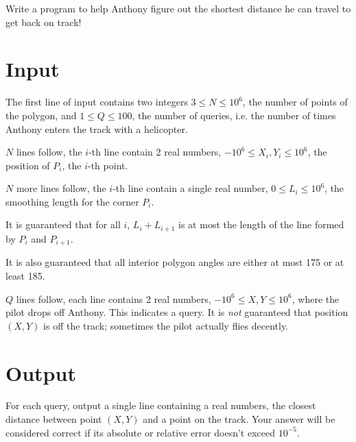 Write a program to help Anthony figure out the shortest distance he can travel to get back on track!

\section*{Input}

The first line of input contains two integers $3 \leq N \leq 10^6$, the number of points of the polygon, and $1\leq Q\leq 100$, the number of queries, i.e. the number of times Anthony enters the track with a helicopter.

$N$ lines follow, the $i$-th line contain 2 real numbers, $-10^6\leq X_i,Y_i\leq 10^6$, the position of $P_i$, the $i$-th point.

$N$ more lines follow, the $i$-th line contain a single real number, $0\leq L_i\leq 10^6$, the smoothing length for the corner $P_{i}$.

It is guaranteed that for all $i$, $L_i+L_{i+1}$ is at most the length of the line formed by $P_i$ and $P_{i+1}$.

It is also guaranteed that all interior polygon angles are either at most 175 or at least 185.

$Q$ lines follow, each line contains 2 real numbers, $-10^6\leq X,Y\leq 10^6$, where the pilot drops off Anthony. This indicates a query. It is \emph{not} guaranteed that position $(X,Y)$ is off the track; sometimes the pilot actually flies decently.

\section*{Output}

For each query, output a single line containing a real numbers, the closest distance between point $(X,Y)$ and a point on the track.
Your answer will be considered correct if its absolute or relative error doesn't exceed $10^{-5}$.

